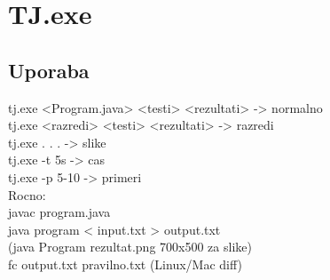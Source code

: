 \documentclass[a4paper,oneside,12pt]{article}
\theoremstyle{definition}
\begin{document}
\section{TJ.exe}
	\subsection{Uporaba}
		tj.exe <Program.java> <testi> <rezultati> -> normalno\\
		tj.exe <razredi> <testi> <rezultati> -> razredi\\
		tj.exe . . . -> slike\\
		tj.exe -t 5s -> cas\\
		tj.exe -p 5-10 -> primeri\\
		Rocno:\\
		javac program.java\\
		java program < input.txt > output.txt\\
		(java Program rezultat.png 700x500 za slike)\\
		fc output.txt pravilno.txt (Linux/Mac diff)\\
\end{document}
